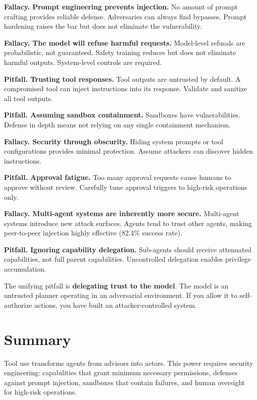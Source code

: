\textbf{Fallacy. Prompt engineering prevents injection.} No amount of prompt crafting provides reliable defense. Adversaries can always find bypasses. Prompt hardening raises the bar but does not eliminate the vulnerability.

\textbf{Fallacy. The model will refuse harmful requests.} Model-level refusals are probabilistic, not guaranteed. Safety training reduces but does not eliminate harmful outputs. System-level controls are required.

\textbf{Pitfall. Trusting tool responses.} Tool outputs are untrusted by default. A compromised tool can inject instructions into its response. Validate and sanitize all tool outputs.

\textbf{Pitfall. Assuming sandbox containment.} Sandboxes have vulnerabilities. Defense in depth means not relying on any single containment mechanism.

\textbf{Fallacy. Security through obscurity.} Hiding system prompts or tool configurations provides minimal protection. Assume attackers can discover hidden instructions.

\textbf{Pitfall. Approval fatigue.} Too many approval requests cause humans to approve without review. Carefully tune approval triggers to high-risk operations only.

\textbf{Fallacy. Multi-agent systems are inherently more secure.} Multi-agent systems introduce new attack surfaces. Agents tend to trust other agents, making peer-to-peer injection highly effective (82.4\% success rate).

\textbf{Pitfall. Ignoring capability delegation.} Sub-agents should receive attenuated capabilities, not full parent capabilities. Uncontrolled delegation enables privilege accumulation.

The unifying pitfall is \textbf{delegating trust to the model}. The model is an untrusted planner operating in an adversarial environment. If you allow it to self-authorize actions, you have built an attacker-controlled system.

\section{Summary}

Tool use transforms agents from advisors into actors. This power requires security engineering: capabilities that grant minimum necessary permissions, defenses against prompt injection, sandboxes that contain failures, and human oversight for high-risk operations.

